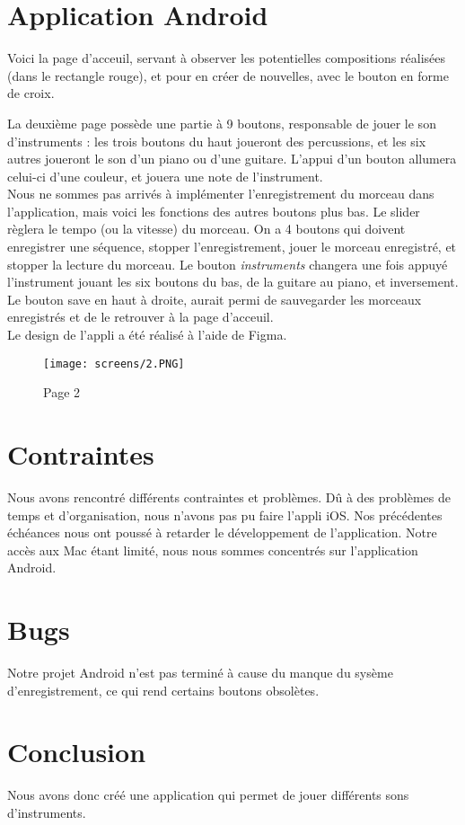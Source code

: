 \documentclass{article}
\begin{document}
\section{Application Android}

Voici la page d'acceuil, servant à observer les potentielles compositions réalisées (dans le rectangle rouge), et pour en créer de nouvelles, avec le bouton en forme de croix.



La deuxième page possède une partie à 9 boutons, responsable de jouer le son d'instruments : les trois boutons du haut joueront des percussions, et les six autres joueront le son d'un piano ou d'une guitare. L'appui d'un bouton allumera celui-ci d'une couleur, et jouera une note de l'instrument. \\
Nous ne sommes pas arrivés à implémenter l'enregistrement du morceau dans l'application, mais voici les fonctions des autres boutons plus bas.
Le slider règlera le tempo (ou la vitesse) du morceau. On a 4 boutons qui doivent enregistrer une séquence, stopper l'enregistrement, jouer le morceau enregistré, et stopper la lecture du morceau. Le bouton \textit{instruments} changera une fois appuyé l'instrument jouant les six boutons du bas, de la guitare au piano, et inversement. Le bouton save en haut à droite, aurait permi de sauvegarder les morceaux enregistrés et de le retrouver à la page d'acceuil.\\
Le design de l'appli a été réalisé à l'aide de Figma.

\begin{figure}[H]
    \centering
    \begin{minipage}[c]{.3\linewidth}
        \centering
        \texttt{[image: screens/2.PNG]}
        \caption{Page 2}
    \end{minipage}
\end{figure}

\newpage


\section{Contraintes}
Nous avons rencontré différents contraintes et problèmes. Dû à des problèmes de temps et d'organisation, nous n'avons pas pu faire l'appli iOS. Nos précédentes échéances nous ont poussé à retarder le développement de l'application. Notre accès aux Mac étant limité, nous nous sommes concentrés sur l'application Android.

\section{Bugs}
Notre projet Android n'est pas terminé à cause du manque du sysème d'enregistrement, ce qui rend certains boutons obsolètes. 

\section{Conclusion}
Nous avons donc créé une application qui permet de jouer différents sons d'instruments.
\end{document}
